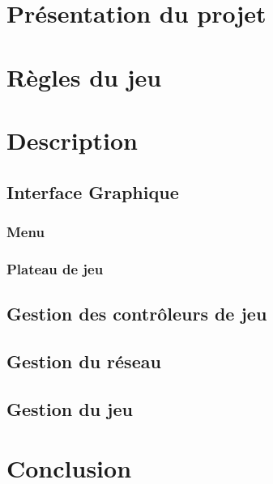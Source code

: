 \section*{Présentation du projet}


\section{Règles du jeu}


\section{Description}

	\subsection{Interface Graphique}
	
		\subsubsection{Menu}
		\subsubsection{Plateau de jeu}
	\subsection{Gestion des contrôleurs de jeu}
	
	\subsection{Gestion du réseau}
	
	\subsection{Gestion du jeu}
	

\section*{Conclusion}

